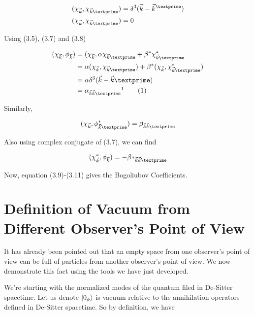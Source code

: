 \begin{align}
&(\chi_{\vec{k}}, \chi_{\vec{k}\textprime}) = \delta^3(\vec{k}-\vec{k}^\textprime) \\
&(\chi_{\vec{k}}, \chi_{\vec{k}\textprime})=0
\end{align}

Using (3.5), (3.7) and (3.8) 
\newcommand\numberthis{\addtocounter{equation}{1}\tag{\theequation}}

\begin{align*}
(\chi_{\vec{k}}, \phi_{\vec{k}}) &= (\chi_{\vec{k}}, \alpha\chi_{\vec{k}\textprime}+ \beta ^*\chi^*_{\vec{k}\textprime}\\
&= \alpha (\chi_{\vec{k}}, \chi_{\vec{k}\textprime}) + \beta ^* (\chi_{\vec{k}}, \chi^*_{\vec{k}\textprime}) \\
&= \alpha \delta^3 (\vec{k}-\vec{k}\textprime) \\
&= \alpha_{\vec{k}\vec{k}\textprime} \footnotemark \numberthis
\end{align*}

Similarly,


\begin{equation}
(\chi_{\vec{k}}, \phi^*_{\vec{k}\textprime}) = \beta_{\vec{k}\vec{k}\textprime}
\end{equation}

Also using complex conjugate of (3.7), we can find

\begin{equation}
(\chi^*_{\vec{k}}, \phi_{\vec{k}}) = -\beta*_{\vec{k}\vec{k}\textprime}
\end{equation}

Now, equation (3.9)-(3.11) gives the Bogoliubov Coefficients.

\section{Definition of Vacuum from Different Observer's Point of View}

It has already been pointed out that an empty space from one observer's point of view can be full of particles from another observer's point of view. We now demonstrate this fact using the tools we have just developed.

We're starting with the normalized modes of the quantum filed in  De-Sitter spacetime. Let us denote $\ket{0_\phi}$ is vacuum relative to the annihilation operators defined in De-Sitter spacetime. So by definition, we have

